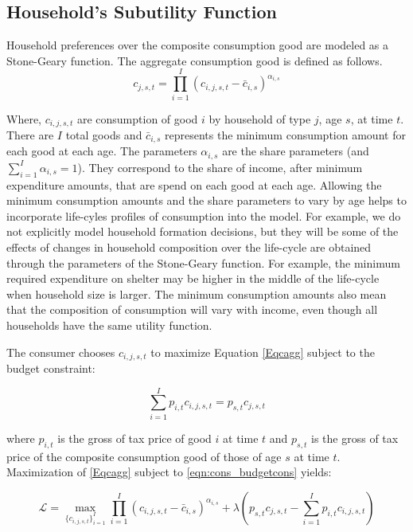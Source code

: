        
    \subsection{Household's Subutility Function}\label{sec:subutil}
    
    Household preferences over the composite consumption good are modeled as a Stone-Geary function. The aggregate consumption good is defined as follows.
    \begin{equation} \label{Eqcagg}
        c_{j,s,t}  = \prod_{i=1}^I \left( c_{i,j,s,t} - \bar c_{i,s} \right) ^{\alpha_{i,s}} 
    \end{equation}

Where, $c_{i,j,s,t}$ are consumption of good $i$ by household of type $j$, age $s$, at time $t$.  There are $I$ total goods and $\bar{c}_{i,s}$ represents the minimum consumption amount for each good at each age.  The parameters $\alpha_{i,s}$ are the share parameters (and $\sum_{i=1}^{I} \alpha_{i,s}=1$).  They correspond to the share of income, after minimum expenditure amounts, that are spend on each good at each age.  Allowing the minimum consumption amounts and the share parameters to vary by age helps to incorporate life-cyles profiles of consumption into the model.  For example, we do not explicitly model household formation decisions, but they will be some of the effects of changes in household composition over the life-cycle are obtained through the parameters of the Stone-Geary function.  For example, the minimum required expenditure on shelter may be higher in the middle of the life-cycle when household size is larger.  The minimum consumption amounts also mean that the composition of consumption will vary with income, even though all households have the same utility function.

The consumer chooses $c_{i,j,s,t}$ to maximize Equation \ref{Eqcagg} subject to the budget constraint:

    \begin{equation} \label{eqn:cons_budgetcons}
        \sum_{i=1}^{I} p_{i,t}c_{i,j,s,t}  = p_{s,t}c_{j,s,t}
    \end{equation}

\noindent where $p_{i,t}$ is the gross of tax price of good $i$ at time $t$ and $p_{s,t}$ is the gross of tax price of the composite consumption good of those of age $s$ at time $t$.  Maximization of \ref{Eqcagg} subject to \ref{eqn:cons_budgetcons} yields:

    \begin{equation} \label{eqn:cons_lagrangian}
       \mathcal{L} =  \max_{\{c_{i,j,s,t}\}_{i=1}^{I}}  \prod_{i=1}^I \left( c_{i,j,s,t} - \bar c_{i,s} \right) ^{\alpha_{i,s}}  + \lambda \left(p_{s,t}c_{j,s,t} - \sum_{i=1}^{I} p_{i,t}c_{i,j,s,t}\right)
    \end{equation}
    
